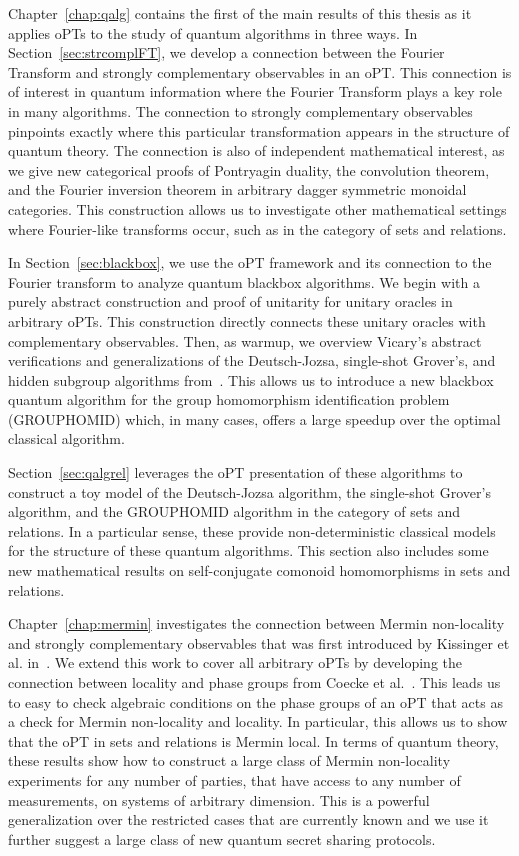 Chapter~\ref{chap:qalg} contains the first of the main results of this thesis as it applies oPTs to the study of quantum algorithms in three ways.  In Section~\ref{sec:strcomplFT}, we develop a connection between the Fourier Transform and strongly complementary observables in an oPT.  This connection is of interest in quantum information where the Fourier Transform plays a key role in many algorithms.  The connection to strongly complementary observables pinpoints exactly where this particular transformation appears in the structure of quantum theory.  The connection is also of independent mathematical interest, as we give new categorical proofs of Pontryagin duality, the convolution theorem, and the Fourier inversion theorem in arbitrary dagger symmetric monoidal categories. This construction allows us to investigate other mathematical settings where Fourier-like transforms occur, such as in the category of sets and relations.

In Section~\ref{sec:blackbox}, we use the oPT framework and its connection to the Fourier transform to analyze quantum blackbox algorithms.  We begin with a purely abstract construction and proof of unitarity for unitary oracles in arbitrary oPTs. This construction directly connects these unitary oracles with complementary observables. Then, as warmup, we overview Vicary's abstract verifications and generalizations  of the Deutsch-Jozsa, single-shot Grover's, and hidden subgroup algorithms from~\cite{vicary-tqa}.  This allows us to introduce a new blackbox quantum algorithm for the group homomorphism identification problem (GROUPHOMID) which, in many cases, offers a large speedup over the optimal classical algorithm.

Section~\ref{sec:qalgrel} leverages the oPT presentation of these algorithms to construct a toy model of the Deutsch-Jozsa algorithm, the single-shot Grover's algorithm, and the GROUPHOMID algorithm in the category of sets and relations. In a particular sense, these provide non-deterministic classical models for the structure of these quantum algorithms. This section also includes some new mathematical results on self-conjugate comonoid homomorphisms in sets and relations.

Chapter~\ref{chap:mermin} investigates the connection between Mermin non-locality and strongly complementary observables that was first introduced by Kissinger et al. in~\cite{coecke2012strong}. We extend this work to cover all arbitrary oPTs by developing the connection between locality and phase groups from Coecke et al.~\cite{coecke2011phase}. This leads us to easy to check algebraic conditions on the phase groups of an oPT that acts as a check for Mermin non-locality and locality. In particular, this allows us to show that the oPT in sets and relations is Mermin local. In terms of quantum theory, these results show how to construct a large class of Mermin non-locality experiments for any number of parties, that have access to any number of measurements, on systems of arbitrary dimension.  This is a powerful generalization over the restricted cases that are currently known and we use it further suggest a large class of new quantum secret sharing protocols.

